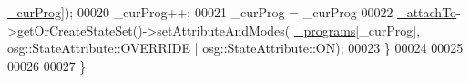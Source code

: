 \begin{DoxyCode}
      \hyperlink{classbrtr_1_1_program_switcher_callback_a06ee6d68fe703e6a88960219b019f1bd}{\_curProg}]);
00020         \_curProg++;
00021         \_curProg = \_curProg %
00022         \hyperlink{classbrtr_1_1_base_interaction_callback_a6666bae9f8f89ebbf75637c922ebfb54}{\_attachTo}->getOrCreateStateSet()->setAttributeAndModes(
      \hyperlink{classbrtr_1_1_program_switcher_callback_a9cbcf4d65f6ee468bb20d16b9e795e49}{\_programs}[\_curProg], osg::StateAttribute::OVERRIDE | osg::StateAttribute::ON);
00023     \}
00024 
00025 
00026 
00027 \}
\end{DoxyCode}
